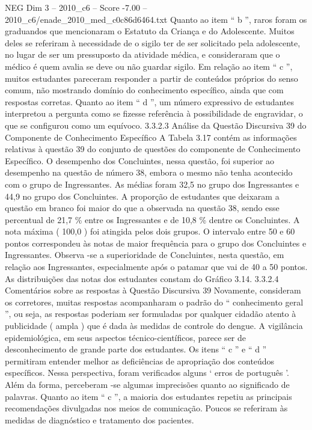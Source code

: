 \begin{textsample}{NEG Dim 3 – 2010\_c6 – Score -7.00 – 2010\_c6/enade\_2010\_med\_c0c86d6464.txt}
Quanto ao item “ b ”, raros foram os graduandos que mencionaram o Estatuto da Criança e do Adolescente.
Muitos deles se referiram à necessidade de o sigilo ter de ser solicitado pela adolescente, no lugar de ser um pressuposto da atividade médica, e consideraram que o médico é quem avalia se deve ou não guardar sigilo.
Em relação ao item “ c ”, muitos estudantes pareceram responder a partir de conteúdos próprios do senso comum, não mostrando domínio do conhecimento específico, ainda que com respostas corretas.
Quanto ao item “ d ”, um número expressivo de estudantes interpretou a pergunta como se fizesse referência à possibilidade de engravidar, o que se configurou como um equívoco. 3.3.2.3 Análise da Questão Discursiva 39 do Componente de Conhecimento Específico A Tabela 3.17 contém as informações relativas à questão 39 do conjunto de questões do componente de Conhecimento Específico.
O desempenho dos Concluintes, nessa questão, foi superior ao desempenho na questão de número 38, embora o mesmo não tenha acontecido com o grupo de Ingressantes.
As médias foram 32,5 no grupo dos Ingressantes e 44,9 no grupo dos Concluintes.
A proporção de estudantes que deixaram a questão em branco foi maior do que a observada na questão 38, sendo esse percentual de 21,7 \% entre os Ingressantes e de 10,8 \% dentre os Concluintes.
A nota máxima ( 100,0 ) foi atingida pelos dois grupos.
O intervalo entre 50 e 60 pontos correspondeu às notas de maior frequência para o grupo dos Concluintes e Ingressantes.
Observa -se a superioridade de Concluintes, nesta questão, em relação aos Ingressantes, especialmente após o patamar que vai de 40 a 50 pontos.
As distribuições das notas dos estudantes constam do Gráfico 3.14. 3.3.2.4 Comentários sobre as respostas à Questão Discursiva 39 Novamente, consideram os corretores, muitas respostas acompanharam o padrão do “ conhecimento geral ”, ou seja, as respostas poderiam ser formuladas por qualquer cidadão atento à publicidade ( ampla ) que é dada às medidas de controle do dengue.
A vigilância epidemiológica, em seus aspectos técnico-científicos, parece ser de desconhecimento de grande parte dos estudantes.
Os itens “ c ” e “ d ” permitiram entender melhor as deficiências de apropriação dos conteúdos específicos.
Nessa perspectiva, foram verificados alguns ‘ erros de português ’.
Além da forma, perceberam -se algumas imprecisões quanto ao significado de palavras.
Quanto ao item “ c ”, a maioria dos estudantes repetiu as principais recomendações divulgadas nos meios de comunicação.
Poucos se referiram às medidas de diagnóstico e tratamento dos pacientes.

\end{textsample}
